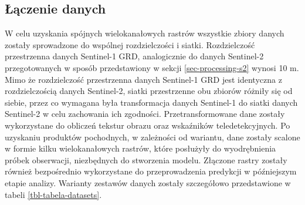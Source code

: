 \documentclass{amuthesis}
\begin{document}
\hypertarget{sec-processing-data-merging}{%
\subsection{Łączenie danych}\label{sec-processing-data-merging}}

W celu uzyskania spójnych wielokanałowych rastrów wszystkie zbiory
danych zostały sprowadzone do wspólnej rozdzielczości i siatki.
Rozdzielczość przestrzenna danych Sentinel-1 GRD, analogicznie do danych
Sentinel-2 przegotowanych w sposób przedstawiony w sekcji
\ref{sec-processing-s2} wynosi 10 m. Mimo że rozdzielczość przestrzenna
danych Sentinel-1 GRD jest identyczna z rozdzielczością danych
Sentinel-2, siatki przestrzenne obu zbiorów różniły się od siebie, przez
co wymagana była transformacja danych Sentinel-1 do siatki danych
Sentinel-2 w celu zachowania ich zgodności. Przetransformowane dane
zostały wykorzystane do obliczeń tekstur obrazu oraz wskaźników
teledetekcyjnych. Po uzyskaniu produktów pochodnych, w zależności od
wariantu, dane zostały scalone w formie kilku wielokanałowych rastrów,
które posłużyły do wyodrębnienia próbek obserwacji, niezbędnych do
stworzenia modelu. Złączone rastry zostały również bezpośrednio
wykorzystane do przeprowadzenia predykcji w późniejszym etapie analizy.
Warianty zestawów danych zostały szczegółowo przedstawione w tabeli
\ref{tbl-tabela-datasets}.
\end{document}
